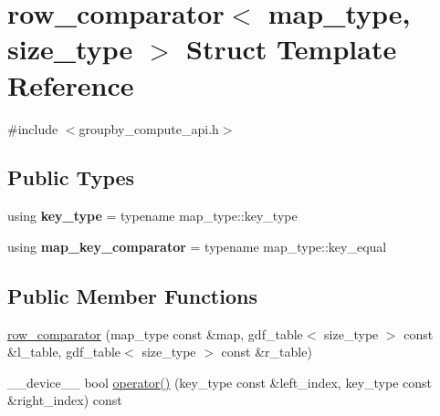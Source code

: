 \hypertarget{structrow__comparator}{}\section{row\+\_\+comparator$<$ map\+\_\+type, size\+\_\+type $>$ Struct Template Reference}
\label{structrow__comparator}


{\ttfamily \#include $<$groupby\+\_\+compute\+\_\+api.\+h$>$}

\subsection*{Public Types}
\begin{DoxyCompactItemize}
\item 
using {\bfseries key\+\_\+type} = typename map\+\_\+type\+::key\+\_\+type\hypertarget{structrow__comparator_ae23601b2cbd61b1915443169ccebe545}{}\label{structrow__comparator_ae23601b2cbd61b1915443169ccebe545}

\item 
using {\bfseries map\+\_\+key\+\_\+comparator} = typename map\+\_\+type\+::key\+\_\+equal\hypertarget{structrow__comparator_a4f2dd22a117e09dcdc645fa4c5712d6d}{}\label{structrow__comparator_a4f2dd22a117e09dcdc645fa4c5712d6d}

\end{DoxyCompactItemize}
\subsection*{Public Member Functions}
\begin{DoxyCompactItemize}
\item 
\hyperlink{structrow__comparator_a30203956e7d237c1b235f002ca372fb7}{row\+\_\+comparator} (map\+\_\+type const \&map, gdf\+\_\+table$<$ size\+\_\+type $>$ const \&l\+\_\+table, gdf\+\_\+table$<$ size\+\_\+type $>$ const \&r\+\_\+table)
\item 
\+\_\+\+\_\+device\+\_\+\+\_\+ bool \hyperlink{structrow__comparator_a6dcb2d9ec909242087324163a50a8f0a}{operator()} (key\+\_\+type const \&left\+\_\+index, key\+\_\+type const \&right\+\_\+index) const 
\end{DoxyCompactItemize}
